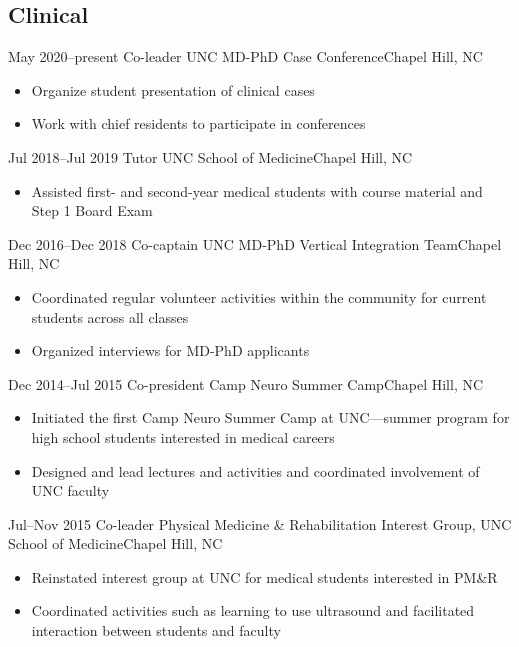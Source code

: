 \documentclass[11pt,a4paper,sans]{moderncv} %
\begin{document}
    \subsection{Clinical}
        \cventry
            {May 2020--present}
            {Co-leader}
            {UNC MD-PhD Case Conference}{Chapel Hill, NC}{}
            {
                \begin{itemize}
                    \item Organize student presentation of clinical cases
                    \item Work with chief residents to participate in conferences
                \end{itemize}
            }
        \cventry
            {Jul 2018--Jul 2019}
            {Tutor}
            {UNC School of Medicine}{Chapel Hill, NC}{}
            {
                \begin{itemize}
                    \item Assisted first- and second-year medical students with course material and Step 1 Board Exam
                \end{itemize}
            }
        \cventry
            {Dec 2016--Dec 2018}
            {Co-captain}
            {UNC MD-PhD Vertical Integration Team}{Chapel Hill, NC}{}
            {
                \begin{itemize}
                    \item Coordinated regular volunteer activities within the community for current students across all classes
                    \item Organized interviews for MD-PhD applicants
                \end{itemize}
            }
        \cventry
            {Dec 2014--Jul 2015}
            {Co-president}
            {Camp Neuro Summer Camp}{Chapel Hill, NC}{}
            {
                \begin{itemize}
                    \item Initiated the first Camp Neuro Summer Camp at UNC---summer program for high school students interested in medical careers
                    \item Designed and lead lectures and activities and coordinated involvement of UNC faculty
                \end{itemize}
            }
        \cventry
            {Jul--Nov 2015}
            {Co-leader}
            {Physical Medicine \& Rehabilitation Interest Group, UNC School of Medicine}{Chapel Hill, NC}{}
            {
                \begin{itemize}
                    \item Reinstated interest group at UNC for medical students interested in PM\&R
                    \item Coordinated activities such as learning to use ultrasound and facilitated interaction between students and faculty
                \end{itemize}
            }
\end{document}
